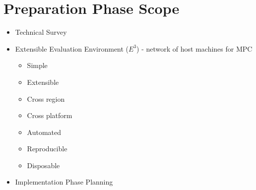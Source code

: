 \hypertarget{preparation-phase-scope}{%
\chapter{Preparation Phase Scope}\label{preparation-phase-scope}}

\begin{itemize}
\tightlist
\item
  Technical Survey
\item
  Extensible Evaluation Environment (\(E^3\)) - network of host machines
  for MPC

  \begin{itemize}
  \tightlist
  \item
    Simple
  \item
    Extensible
  \item
    Cross region
  \item
    Cross platform
  \item
    Automated
  \item
    Reproducible
  \item
    Disposable
  \end{itemize}
\item
  Implementation Phase Planning
\end{itemize}
